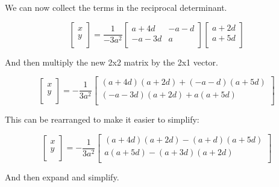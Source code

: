 \documentclass[12pt]{article}
\begin{document}
	We can now collect the terms in the reciprocal determinant.
	
	 	\begin{equation*}
	 	\left [ \begin{array}{c}
	 		x \\
	 		y \\
	 	\end{array}\right ] = 
	 	\frac{1}{-3a^2}
	 	\left [ \begin{array}{cc} 
	 		a + 4d & -a - d \\
	 		-a - 3d & a \\
	 	\end{array} \right ]
	 	\left [ \begin{array}{c}
	 		a + 2d \\
	 		a + 5d \\
	 	\end{array}\right ]
	 \end{equation*}

	And then multiply the new 2x2 matrix by the 2x1 vector.
	
	\begin{equation*}
		\left [ \begin{array}{c}
			x \\
			y \\
		\end{array}\right ] = 
	 	-\frac{1}{3a^2}
		\left [ \begin{array}{c} 
			(a + 4d)(a + 2d) + (-a - d)(a + 5d) \\
			(-a - 3d)(a + 2d) + a(a + 5d) \\
		\end{array} \right ]
	\end{equation*}

	This can be rearranged to make it easier to simplify:
	
	\begin{equation*}
		\left [ \begin{array}{c}
			x \\
			y \\
		\end{array}\right ] = 
		-\frac{1}{3a^2}
		\left [ \begin{array}{c} 
			(a + 4d)(a + 2d) - (a + d)(a + 5d) \\
			a(a + 5d) - (a + 3d)(a + 2d) \\
		\end{array} \right ]
	\end{equation*}

	And then expand and simplify.
	
\end{document}
